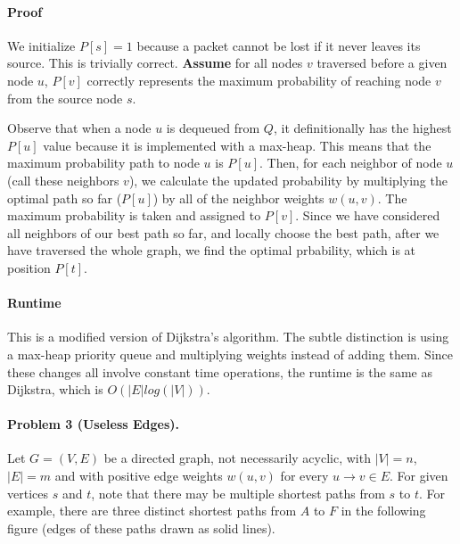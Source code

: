 \documentclass[11pt]{article}
\begin{document}
\paragraph{Proof}
We initialize $P[s] = 1$ because a packet cannot be lost if it never leaves its
source. This is trivially correct. \textbf{Assume} for all nodes $v$ traversed
before a given node $u$, $P[v]$ correctly represents the maximum probability of
reaching node $v$ from the source node $s$.

Observe that when a node $u$ is dequeued from $Q$, it definitionally has the
highest $P[u]$ value because it is implemented with a max-heap. This means that
the maximum probability path to node $u$ is $P[u]$. Then, for each neighbor of
node $u$ (call these neighbors $v$), we calculate the updated probability by
multiplying the optimal path so far ($P[u]$) by all of the neighbor weights
$w(u,v)$. The maximum probability is taken and assigned to $P[v]$. Since we have
considered all neighbors of our best path so far, and locally choose the best 
path, after we have traversed the whole graph, we find the optimal prbability,
which is at position $P[t]$.

\paragraph{Runtime}
This is a modified version of Dijkstra's algorithm. The subtle distinction is
using a max-heap priority queue and multiplying weights instead of adding them.
Since these changes all involve constant time operations, the runtime is the
same as Dijkstra, which is $O(|E| log(|V|))$.

\newpage
\paragraph{Problem 3 (Useless Edges).} Let  $G=(V, E)$ be a directed graph, not necessarily acyclic, with  $|V|=n$, $|E|=m$ and with positive edge weights $w(u, v)$ for every $u \rightarrow v \in E$. For given vertices $s$ and $t$, note that there may be multiple shortest paths from $s$ to $t$. For example, there are three distinct shortest paths from $A$ to $F$ in the following figure (edges of these paths drawn as solid lines).
\end{document}
